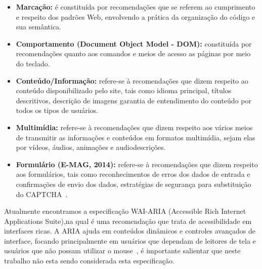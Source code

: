 \begin{itemize}
  \item \textbf{Marca\c{c}\~ao:} \'e constitu\'ida por recomenda\c{c}\~oes que
  se referem ao cumprimento e respeito dos padr\~oes Web, envolvendo a pr\'atica da organiza\c{c}\~ao do
  c\'odigo e sua sem\^antica. 
  \item \textbf{Comportamento (Document Object Model - DOM):} constitu\'ida por
  recomenda\c{c}\~oes quanto aos comandos e meios de acesso as p\'aginas por
  meio do teclado.  
  \item \textbf{Conte\'udo/Informa\c{c}\~ao:} refere-se \`a recomenda\c{c}\~oes
  que dizem respeito ao conte\'udo disponibilizado pelo site, tais como idioma principal, t\'itulos
  descritivos, descri\c{c}\~ao de imagens garantia de entendimento do conte\'udo
  por todos os tipos de usu\'arios.  
  \item \textbf{Multim\'idia:} refere-se \`a recomenda\c{c}\~oes que dizem
  respeito aos v\'arios meios de transmitir as informa\c{c}\~oes e conte\'udos em formatos
  multim\'idia, sejam elas por v\'ideos, \'audios, anima\c{c}\~oes e
  audiodescri\c{c}\~oes.
  \item \textbf{Formul\'ario (E-MAG, 2014):} refere-se \`a recomenda\c{c}\~oes
  que dizem respeito aos formul\'arios, tais como reconhecimentos de erros dos dados de
  entrada e confirma\c{c}\~oes de envio dos dados, estrat\'egias de
  seguran\c{c}a para substitui\c{c}\~ao do CAPTCHA~\cite{eMAG}.  
\end{itemize}
 
 Atualmente encontramos a especifica\c{c}\~ao WAI-ARIA
 (Accessible Rich Internet Applications Suite),na qual \'e uma
 recomenda\c{c}\~ao que trata de acessibilidade em interfaces ricas. A ARIA ajuda em conte\'udos 
 din\^amicos e controles avan\c{c}ados de interface, focando principalmente
 em usu\'arios que dependam de leitores de tela e usu\'arios que n\~ao possam
 utilizar o mouse~\cite{W3C}, é importante salientar que neste trabalho não
 esta sendo considerada esta especificação.


